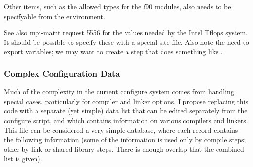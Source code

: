 \documentclass{article}
\begin{document}
Other items, such as the allowed types for the f90 modules, also needs
to be specifyable from the environment.

See also mpi-maint request 5556 for the values needed by the Intel
Tflops system.  It should be possible to specify these with a special
site file.  Also note the need to export variables; we may want to
create a step that does something like .  

\subsubsection{Complex Configuration Data}
Much of the complexity in the current configure system comes from
handling special cases, particularly for compiler and linker options.
I propose replacing this code with a separate (yet simple) data list
that can be edited separately from the configure script, and which
contains information on various compilers and linkers.
This file can be considered a very simple database, where each record
contains the following information (some of the information is used
only by compile steps; other by link or shared library steps.  There
is enough overlap that the combined list is given).
\end{document}
